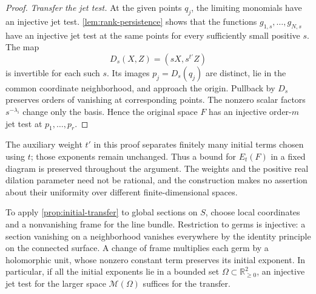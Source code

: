 \begin{proof}
\emph{Transfer the jet test.} At the given points $q_j$, the limiting monomials have an injective jet test.  \cref{lem:rank-persistence} shows that the functions $g_{1,s},\ldots,g_{N,s}$ have an injective jet test at the same points for every sufficiently small positive $s$.  The map
\[
 D_s(X,Z)=(sX,s^{t'}Z)
\]
is invertible for each such $s$.  Its images $p_j=D_s(q_j)$ are distinct, lie in the common coordinate neighborhood, and approach the origin. Pullback by $D_s$ preserves orders of vanishing at corresponding points.  The nonzero scalar factors $s^{-\lambda_i}$ change only the basis.  Hence the original space $F$ has an injective order-$m$ jet test at $p_1,\ldots,p_r$.
\end{proof}

The auxiliary weight $t'$ in this proof separates finitely many initial terms chosen using $t$; those exponents remain unchanged.  Thus a bound for $E_t(F)$ in a fixed diagram is preserved throughout the argument. The weights and the positive real dilation parameter need not be rational, and the construction makes no assertion about their uniformity over different finite-dimensional spaces.

To apply \cref{prop:initial-transfer} to global sections on $S$, choose local coordinates and a nonvanishing frame for the line bundle.  Restriction to germs is injective: a section vanishing on a neighborhood vanishes everywhere by the identity principle on the connected surface.  A change of frame multiplies each germ by a holomorphic unit, whose nonzero constant term preserves its initial exponent.  In particular, if all the initial exponents lie in a bounded set $\Omega\subset\mathbb{R}_{\ge0}^2$, an injective jet test for the larger space $\mathcal{M}(\Omega)$ suffices for the transfer.
